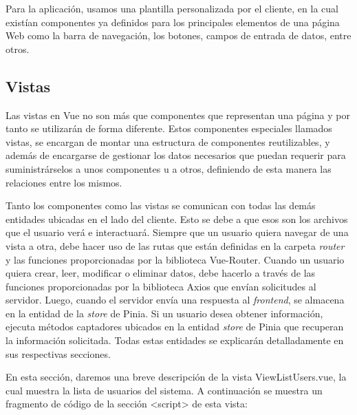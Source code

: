 Para la aplicación, usamos una plantilla personalizada por el cliente, en la cual existían componentes ya definidos para los principales elementos de una página Web como la barra de navegación, los botones, campos de entrada de datos, entre otros.

\subsection{Vistas}
Las vistas en Vue no son más que componentes que representan una página y por tanto se utilizarán de forma diferente. Estos componentes especiales llamados vistas, se encargan de montar una estructura de componentes reutilizables, y además de encargarse de gestionar los datos necesarios que puedan requerir para suministrárselos a unos componentes u a otros, definiendo de esta manera las relaciones entre los mismos.


Tanto los componentes como las vistas se comunican con todas las demás entidades ubicadas en el lado del cliente. Esto se debe a que esos son los archivos que el usuario verá e interactuará. Siempre que un usuario quiera navegar de una vista a otra, debe hacer uso de las rutas que están definidas en la carpeta \textit{router} y las funciones proporcionadas por la biblioteca Vue-Router. Cuando un usuario quiera crear, leer, modificar o eliminar datos, debe hacerlo a través de las funciones proporcionadas por la biblioteca Axios que envían solicitudes al servidor. Luego, cuando el servidor envía una respuesta al \textit{frontend}, se almacena en la entidad de la \textit{store} de Pinia. Si un usuario desea obtener información, ejecuta métodos captadores ubicados en la entidad \textit{store} de Pinia que recuperan la información solicitada. Todas estas entidades se explicarán detalladamente en sus respectivas secciones.

En esta sección, daremos una breve descripción de la vista ViewListUsers.vue, la cual muestra la lista de usuarios del sistema. A continuación se muestra un fragmento de código de la sección <script> de esta vista:

